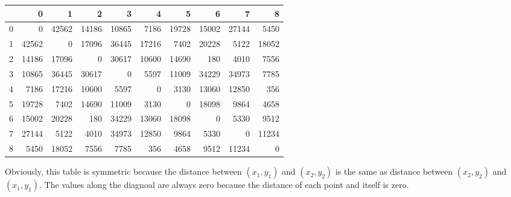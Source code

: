   \hspace{0.1in}
  \begin{tt}
\begin{tabular}{|r|rrrrrrrrr|}  \hline
& 0 & 1 & 2 & 3 & 4 & 5 & 6 & 7 & 8 \\ \hline

  0 &0 & 42562 & 14186 & 10865 & 7186 & 19728 & 15002 & 27144 & 5450\\

1 &42562 & 0 & 17096 & 36445 & 17216 & 7402 & 20228 & 5122 & 18052\\

2 &14186 & 17096 & 0 & 30617 & 10600 & 14690 & 180 & 4010 & 7556\\

3 &10865 & 36445 & 30617 & 0 & 5597 & 11009 & 34229 & 34973 & 7785\\

4 &7186 & 17216 & 10600 & 5597 & 0 & 3130 & 13060 & 12850 & 356\\

5 &19728 & 7402 & 14690 & 11009 & 3130 & 0 & 18098 & 9864 & 4658\\

6 &15002 & 20228 & 180 & 34229 & 13060 & 18098 & 0 & 5330 & 9512\\

7 &27144 & 5122 & 4010 & 34973 & 12850 & 9864 & 5330 & 0 & 11234\\

8 &5450 & 18052 & 7556 & 7785 & 356 & 4658 & 9512 & 11234 &
0 \\ \hline
\end{tabular}
\end{tt}
\hspace{0.1in}

Obviously, this table is symmetric because the distance between $(x_1,
y_1)$ and $(x_2, y_2)$ is the same as distance between $(x_2, y_2)$
and $(x_1, y_1)$. The values along the diagnoal are always zero
because the distance of each point and itself is zero.




